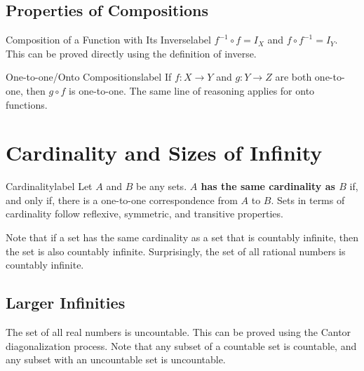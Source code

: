 \documentclass[a4paper]{report}
\begin{document}
\subsection{Properties of Compositions}

\begin{theorem}{Composition of a Function with Its Inverse}{label}
    $f^{-1} \circ f = I_X$ and $f \circ f^{-1} = I_Y$. This can be proved directly using the
    definition of inverse.
\end{theorem}

\begin{theorem}{One-to-one/Onto Compositions}{label}
    If $f: X \to Y$ and $g: Y \to Z$ are both one-to-one, then $g \circ f$ is one-to-one.
    The same line of reasoning applies for onto functions.
\end{theorem}

\section{Cardinality and Sizes of Infinity}

\begin{definition}{Cardinality}{label}
    Let $A$ and $B$ be any sets. \textbf{$A$ has the same cardinality as $B$} if, and only if, there is
    a one-to-one correspondence from $A$ to $B$. Sets in terms of cardinality follow reflexive,
    symmetric, and transitive properties.
\end{definition}

Note that if a set has the same cardinality as a set that is countably infinite, then the set is
also countably infinite. Surprisingly, the set of all rational numbers is countably infinite.

\subsection{Larger Infinities}

The set of all real numbers is uncountable. This can be proved using the Cantor diagonalization process.
Note that any subset of a countable set is countable, and any subset with an uncountable set is uncountable.
\end{document}
